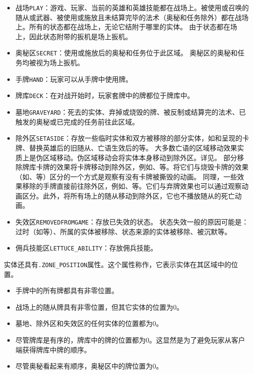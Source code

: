 \begin{itemize}[itemsep=\parsep]
    \item 战场\texttt{PLAY}：游戏、玩家、当前的英雄和英雄技能都在战场上。被使用或召唤的随从或武器、被使用或施放且未结算完毕的法术（奥秘和任务除外）都在战场上。所有的状态都在战场上，无论它结附于哪里的实体。
        \notice 由于状态都在场上，因此状态附带的扳机是场上扳机。
    \item 奥秘区\texttt{SECRET}：使用或施放后的奥秘和任务位于此区域。
        \notice 奥秘区的奥秘和任务均被视为场上扳机。
    \item 手牌\texttt{HAND}：玩家可以从手牌中使用牌。
    \item 牌库\texttt{DECK}：在对战开始时，玩家套牌中的牌都位于牌库中。
    \item 墓地\texttt{GRAVEYARD}：死去的实体、弃掉或烧毁的牌、被反制或结算完的法术、已触发的奥秘或已完成的任务前往此区域。
    \item 除外区\texttt{SETASIDE}：存放一些临时实体和双方被移除的部分实体，如和呈现的卡牌、替换英雄后的旧随从、亡语生效后的等。
        \notice 大多数亡语的区域移动效果实质上是伪区域移动。伪区域移动会将实体本身移动到除外区。详见。
        \notice 部分移除牌库卡牌的效果将卡牌移动到除外区，例如、等。将它们与烧毁卡牌的效果（如、等）区分的一个方式是观察有没有卡牌被撕毁的动画。
        \notice 同理，一些效果移除的手牌直接前往除外区，例如、等。它们与弃牌效果也可以通过观察动画区分。此外，将所有场上的随从移动到除外区，它也不播放随从的死亡动画。
    \item 失效区\texttt{REMOVEDFROMGAME}：存放已失效的状态。
        \notice 状态失效一般的原因可能是：过时（如等）、所属的实体被移除、状态来源的实体被移除、被沉默等。
    \item 佣兵技能区\texttt{LETTUCE\_ABILITY}：存放佣兵技能。
\end{itemize}

实体还具有\texttt{.ZONE\_POSITION}属性。这个属性称作，它表示实体在其区域中的位置。
\begin{itemize}
    \item 手牌中的所有牌都具有非零位置。
    \item 战场上的随从牌具有非零位置，但其它实体的位置为0。
    \item 墓地、除外区和失效区的任何实体的位置都为0。
    \item 尽管牌库是有序的，牌库中的牌的位置都为0。这显然是为了避免玩家从客户端获得牌库中牌的顺序。
    \item 尽管奥秘看起来有顺序，奥秘区中的牌位置为0。
\end{itemize}


